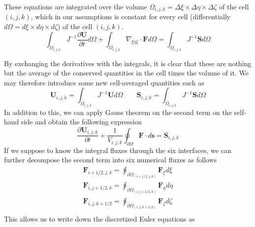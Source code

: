 These equations are integrated over the volume $\Omega_{i, j, k} = \Delta \xi \times \Delta \eta \times \Delta \zeta $ of the cell $(i, j, k)$, which in our assumptions is constant for every cell (differentially $d \Omega = d \xi \times d \eta \times d \zeta$) of the cell $(i, j, k)$.
\begin{equation}
	\int_{\Omega_{i, j, k}} J^{-1} \frac{\partial \mathbf{U}}{\partial t} d \Omega + \int_{\Omega_{i, j, k}} \nabla_{\xi \eta \zeta} \cdot \mathbf{F} d\Omega = \int_{\Omega_{i, j, k}} J^{-1} \mathbf{S} d \Omega
\end{equation}

By exchanging the derivatives with the integrals, it is clear that these are nothing but the average of the conserved quantities in the cell times the volume of it. We may therefore introduce some new cell-averaged quantities such as 
\begin{equation}
\mathbf{U}_{i, j, k} = \int_{\Omega_{i, j, k}} J^{-1} \mathbf{U} d \Omega \qquad \mathbf{S}_{i, j, k} = \int_{\Omega_{i, j, k}} J^{-1} \mathbf{S} d \Omega
\end{equation}
In addition to this, we can apply Gauss theorem on the second term on the self-hand side and obtain the following expression
\begin{equation}
	\frac{\partial \mathbf{U}_{i, j, k}}{\partial t} + \frac{1}{V_{i, j, k}} \oint_{\partial \Omega} \mathbf{F} \cdot d \mathbf{s} = \mathbf{S}_{i, j, k}
\end{equation}
If we suppose to know the integral fluxes through the six interfaces, we can further decompose the second term into six numerical fluxes as follows
\begin{equation}
\begin{split}
	\mathbf{F}_{i+ 1/2, j, k} = \oint_{\partial \Omega_{(i + 1/2, j, k)}} \mathbf{F}_{\xi} d \xi \\
	\mathbf{F}_{i, j + 1/2, k} = \oint_{\partial \Omega_{(i , j + 1/2, k)}} \mathbf{F}_{\eta} d \eta \\
	\mathbf{F}_{i, j, k + 1/2} = \oint_{\partial \Omega_{(i , j, k + 1/2)}} \mathbf{F}_{\zeta} d \zeta \\
\end{split}
\end{equation}
This allows us to write down the discretized Euler equations as 

